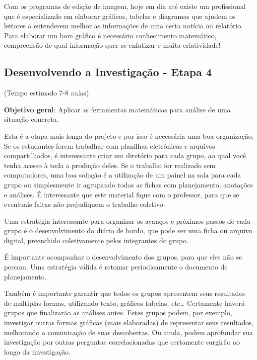 Com os programas de edição de imagem, hoje em dia até existe um profissional que é especializado em elaborar gráficos, tabelas e diagramas que ajudem os leitores a entenderem melhor as informações de uma certa notícia ou relatório. Para elaborar um bom gráfico é necessário conhecimento matemático, compreensão de qual informação quer-se enfatizar e muita criatividade!
\clearmargin
\def\currentcolor{session2}
\begin{texto}
{\vspace{-\baselineskip}
\section{Desenvolvendo a Investigação - Etapa 4}
(Tempo estimado 7-8 aulas)

\textbf{Objetivo geral}: Aplicar as ferramentas matemáticas para análise de uma situação concreta.

Esta é a etapa mais longa do projeto e por isso é necessária uma boa organização. Se os estudantes forem trabalhar com planilhas eletrônicas e arquivos compartilhados, é interessante criar um diretório para cada grupo, ao qual você tenha acesso à toda a produção deles. Se o trabalho for realizado sem computadores, uma boa solução é a utilização de um painel na sala para cada grupo ou simplesmente ir agrupando todas as fichas com planejamento, anotações e análises. É interessante que este material fique com o professor, para que se eventuais faltas não prejudiquem o trabalho coletivo. 

Uma estratégia interessante para organizar os avanços e próximos passos de cada grupo é o desenvolvimento do diário de bordo, que pode ser uma ficha ou arquivo digital, preenchido coletivamente pelos integrantes do grupo. 

É importante acompanhar o desenvolvimento dos grupos, para que eles não se percam. Uma estratégia válida é retomar periodicamente o documento de planejamento.

Também é importante garantir que todos os grupos apresentem seus resultados de múltiplas formas, utilizando texto, gráficos tabelas, etc… Certamente haverá grupos que finalizarão as análises antes. Estes grupos podem, por exemplo, investigar outras formas gráficas (mais elaboradas) de representar seus resultados, melhorando a comunicação de suas descobertas. Ou ainda, podem aprofundar sua investigação por outras perguntas correlacionadas que certamente surgirão ao longo da investigação. 

}
\end{texto}
